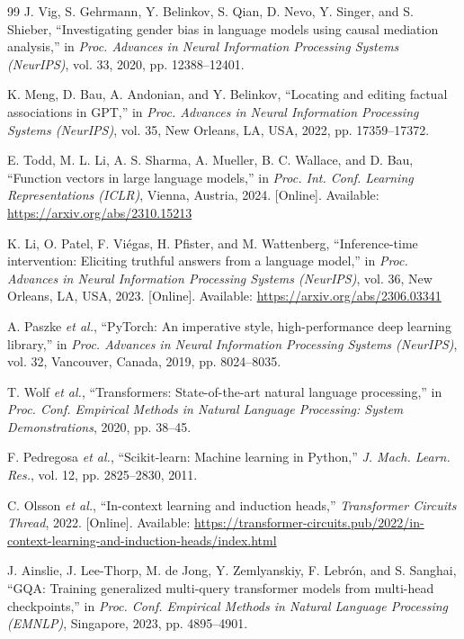 \begin{thebibliography}{99}
J. Vig, S. Gehrmann, Y. Belinkov, S. Qian, D. Nevo, Y. Singer, and S. Shieber,
``Investigating gender bias in language models using causal mediation analysis,''
in \textit{Proc. Advances in Neural Information Processing Systems (NeurIPS)},
vol. 33, 2020, pp. 12388--12401.

K. Meng, D. Bau, A. Andonian, and Y. Belinkov,
``Locating and editing factual associations in GPT,''
in \textit{Proc. Advances in Neural Information Processing Systems (NeurIPS)},
vol. 35, New Orleans, LA, USA, 2022, pp. 17359--17372.

E. Todd, M. L. Li, A. S. Sharma, A. Mueller, B. C. Wallace, and D. Bau,
``Function vectors in large language models,''
in \textit{Proc. Int. Conf. Learning Representations (ICLR)},
Vienna, Austria, 2024. [Online]. Available: \url{https://arxiv.org/abs/2310.15213}

K. Li, O. Patel, F. Vi\'egas, H. Pfister, and M. Wattenberg,
``Inference-time intervention: Eliciting truthful answers from a language model,''
in \textit{Proc. Advances in Neural Information Processing Systems (NeurIPS)},
vol. 36, New Orleans, LA, USA, 2023. [Online]. Available: \url{https://arxiv.org/abs/2306.03341}

A. Paszke \textit{et al.},
``PyTorch: An imperative style, high-performance deep learning library,''
in \textit{Proc. Advances in Neural Information Processing Systems (NeurIPS)},
vol. 32, Vancouver, Canada, 2019, pp. 8024--8035.

T. Wolf \textit{et al.},
``Transformers: State-of-the-art natural language processing,''
in \textit{Proc. Conf. Empirical Methods in Natural Language Processing: System Demonstrations},
2020, pp. 38--45.

F. Pedregosa \textit{et al.},
``Scikit-learn: Machine learning in Python,''
\textit{J. Mach. Learn. Res.}, vol. 12, pp. 2825--2830, 2011.

C. Olsson \textit{et al.},
``In-context learning and induction heads,''
\textit{Transformer Circuits Thread}, 2022.
[Online]. Available: \url{https://transformer-circuits.pub/2022/in-context-learning-and-induction-heads/index.html}

J. Ainslie, J. Lee-Thorp, M. de Jong, Y. Zemlyanskiy, F. Lebr\'on, and S. Sanghai,
``GQA: Training generalized multi-query transformer models from multi-head checkpoints,''
in \textit{Proc. Conf. Empirical Methods in Natural Language Processing (EMNLP)},
Singapore, 2023, pp. 4895--4901.


\end{thebibliography}
